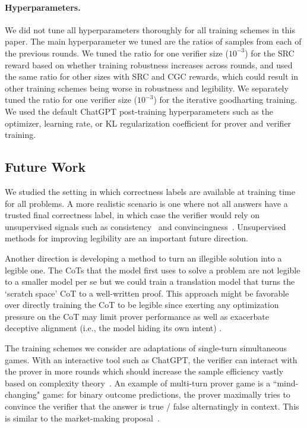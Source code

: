 \documentclass{article}
\begin{document}
\paragraph{Hyperparameters.}
We did not tune all hyperparameters thoroughly for all training schemes in this paper. The main hyperparameter we tuned are the ratios of samples from each of the previous rounds. We tuned the ratio for one verifier size ($10^{-3}$) for the SRC reward based on whether training robustness increases across rounds, and used the same ratio for other sizes with SRC and CGC rewards, which could result in other training schemes being worse in robustness and legibility. We separately tuned the ratio for one verifier size ($10^{-3}$) for the iterative goodharting training. We used the default ChatGPT post-training hyperparameters such as the optimizer, learning rate, or KL regularization coefficient for prover and verifier training.


\subsection{Future Work}
We studied the setting in which correctness labels are available at training time for all problems. A more realistic scenario is one where not all answers have a trusted final correctness label, in which case the verifier would rely on unsupervised signals such as consistency~\citep{wang2023selfconsistency} and convincingness~\citep{khan2024debating}. Unsupervised methods for improving legibility are an important future direction.

Another direction is developing a method to turn an illegible solution into a legible one. The CoTs that the model first uses to solve a problem are not legible to a smaller model per se but we could train a translation model that turns the `scratch space' CoT to a well-written proof. This approach might be favorable over directly training the CoT to be legible since exerting any optimization pressure on the CoT may limit prover performance as well as exacerbate deceptive alignment (i.e., the model hiding its own intent) \citep{denison2024sycophancy,hubinger2024sleeper}. 

The training schemes we consider are adaptations of single-turn simultaneous games. With an interactive tool such as ChatGPT, the verifier can interact with the prover in more rounds which should increase the sample efficiency vastly based on complexity theory~\citep{goldwasser2021interactive}. An example of multi-turn prover game is a ``mind-changing" game: for binary outcome predictions, the prover maximally tries to convince the verifier that the answer is true / false alternatingly in context. This is similar to the market-making proposal~\citep{marketmaking}.
\end{document}
